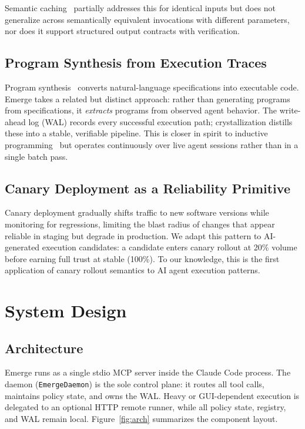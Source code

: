 \documentclass[11pt,a4paper]{article}
\begin{document}
Semantic caching~\cite{bang2023gptcache} partially addresses this for identical inputs but does not generalize
across semantically equivalent invocations with different parameters, nor does it support structured output
contracts with verification.

\subsection{Program Synthesis from Execution Traces}

Program synthesis~\cite{ellis2021dreamcoder,gulwani2017program} converts natural-language specifications into
executable code.
Emerge takes a related but distinct approach: rather than generating programs from specifications, it
\emph{extracts} programs from observed agent behavior.
The write-ahead log (WAL) records every successful execution path; crystallization distills these into a
stable, verifiable pipeline.
This is closer in spirit to inductive programming~\cite{de2008inductive} but operates continuously over live
agent sessions rather than in a single batch pass.

\subsection{Canary Deployment as a Reliability Primitive}

Canary deployment gradually shifts traffic to new software versions while monitoring for regressions,
limiting the blast radius of changes that appear reliable in staging but degrade in production.
We adapt this pattern to AI-generated execution candidates: a candidate enters canary rollout at 20\%
volume before earning full trust at stable (100\%).
To our knowledge, this is the first application of canary rollout semantics to AI agent execution patterns.

\section{System Design}

\subsection{Architecture}

Emerge runs as a single stdio MCP server inside the Claude Code process.
The daemon (\texttt{EmergeDaemon}) is the sole control plane: it routes all tool calls, maintains policy
state, and owns the WAL.
Heavy or GUI-dependent execution is delegated to an optional HTTP remote runner, while all policy state,
registry, and WAL remain local.
Figure~\ref{fig:arch} summarizes the component layout.
\end{document}
